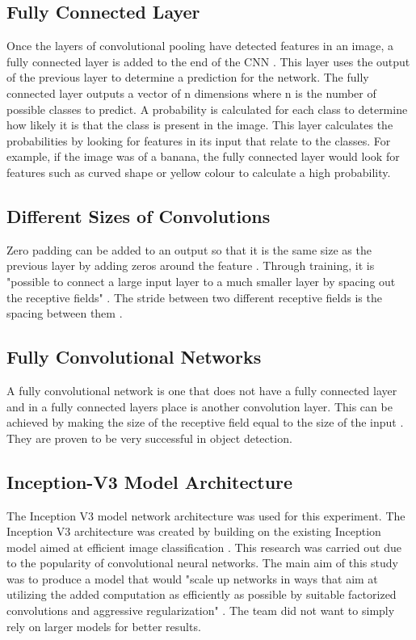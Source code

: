 \tocless\subsection{Fully Connected Layer}
Once the layers of convolutional pooling have detected features in an image, a fully connected layer is added to the end of the CNN \parencite{fullyConnectedLayer}.
This layer uses the output of the previous layer to determine a prediction for the network.
The fully connected layer outputs a vector of n dimensions where n is the number of possible classes to predict.
A probability is calculated for each class to determine how likely it is that the class is present in the image.
This layer calculates the probabilities by looking for features in its input that relate to the classes.
For example, if the image was of a banana, the fully connected layer would look for features such as curved shape or yellow colour to calculate a high probability.


\tocless\subsection{Different Sizes of Convolutions}
Zero padding can be added to an output so that it is the same size as the previous layer by adding zeros around the feature \parencite{handsOnML}.
Through training, it is "possible to connect a large input layer to a much smaller layer by spacing out the receptive fields" \parencite{handsOnML}.
The stride between two different receptive fields is the spacing between them \parencite{handsOnML}.


\tocless\subsection{Fully Convolutional Networks}
A fully convolutional network is one that does not have a fully connected layer
and in a fully connected layers place is another convolution layer.
This can be achieved by making the size of the receptive field equal to the size of the input \parencite{digits}.
They are proven to be very successful in object detection.


\tocless\subsection{Inception-V3 Model Architecture}
The Inception V3 model network architecture was used for this experiment. The
Inception V3 architecture was created by building on the existing Inception
model aimed at efficient image classification \parencite{rethinkingInception}.
This research was carried out due to the popularity of convolutional neural networks.
The main aim of this study was to produce a model that would "scale up networks in ways that aim at utilizing the added computation as efficiently as possible by suitable factorized convolutions and aggressive regularization" \parencite{rethinkingInception}.
The team did not want to simply rely on larger models for better results.

